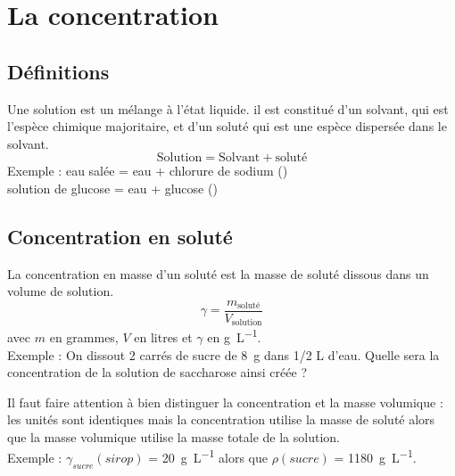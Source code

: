 \documentclass[a4paper,11pt,fleqn]{article}%
\begin{document}
\maketitle

\section{La concentration}
	\subsection{Définitions}
	Une solution est un mélange à l'état liquide. il est constitué d'un solvant, qui est l'espèce chimique majoritaire, et d'un soluté qui est une espèce dispersée dans le solvant.\\
	$$\text{Solution} = \text{Solvant} + \text{soluté}$$
	\textcolor{green!50!black}{Exemple : eau salée = eau + chlorure de sodium ()\\
	solution de glucose = eau + glucose ()}
	
	\subsection{Concentration en soluté}
	La concentration en masse d'un soluté est la masse de soluté dissous dans un volume de solution. $$\gamma = \dfrac{m_{\text{soluté}}}{V_{\text{solution}}}$$
	avec $m$ en grammes, $V$ en litres et $\gamma$ en \unit{\gram\per\liter}.\\
	\textcolor{green!50!black}{Exemple : On dissout 2 carrés de sucre de \SI{8}{g} dans 1/2 L d'eau. Quelle sera la concentration de la solution de saccharose ainsi créée ?}\\
	
	\vspace*{2cm}
	
	Il faut faire attention à bien distinguer la concentration et la masse volumique : les unités sont identiques mais la concentration utilise la masse de soluté alors que la masse volumique utilise la masse totale de la solution.\\
	\textcolor{green!50!black}{Exemple : $\gamma_{sucre}(sirop)$ = \SI{20}{\gram\per\liter}  alors que $\rho(sucre)$ = \SI{1180}{\gram\per\liter}.}
	
\end{document}
